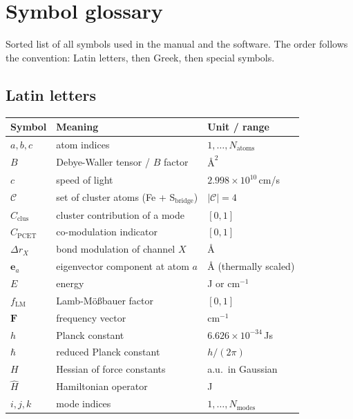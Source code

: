 \documentclass[11pt,a4paper,twoside]{article}
\providecommand{\angstrom}{\text{\AA}}    %
\theoremstyle{remark}
\begin{document}
\section{Symbol glossary}
\label{app:symbols}

Sorted list of all symbols used in the manual and the software.
The order follows the convention: Latin letters, then Greek, then
special symbols.

\subsection{Latin letters}

\begin{tabular}{p{1.5cm} p{6cm} p{4cm}}
  \toprule
  \textbf{Symbol} & \textbf{Meaning} & \textbf{Unit / range} \\
  \midrule
  $a, b, c$       & atom indices        & $1, \ldots, N_\text{atoms}$ \\
  $B$             & Debye-Waller tensor / $B$ factor & $\angstrom^2$ \\
  $c$             & speed of light & $2.998 \times 10^{10}$\,cm/s \\
  $\mathcal{C}$   & set of cluster atoms (Fe + S$_\text{bridge}$) & $|\mathcal{C}| = 4$ \\
  $C_\text{clus}$ & cluster contribution of a mode & $[0, 1]$ \\
  $C_\text{PCET}$ & co-modulation indicator & $[0, 1]$ \\
  $\Delta r_X$    & bond modulation of channel $X$ & $\angstrom$ \\
  $\mathbf{e}_a$  & eigenvector component at atom $a$ & $\angstrom$ (thermally scaled) \\
  $E$             & energy & J or cm$^{-1}$ \\
  $f_\text{LM}$   & Lamb-M\"o{\ss}bauer factor & $[0, 1]$ \\
  $\mathbf{F}$    & frequency vector & cm$^{-1}$ \\
  $h$             & Planck constant & $6.626 \times 10^{-34}$\,Js \\
  $\hbar$         & reduced Planck constant & $h/(2\pi)$ \\
  $H$             & Hessian of force constants & a.u.\ in Gaussian \\
  $\hat{H}$       & Hamiltonian operator & J \\
  $i, j, k$       & mode indices        & $1, \ldots, N_\text{modes}$ \\

\end{tabular}
\end{document}
